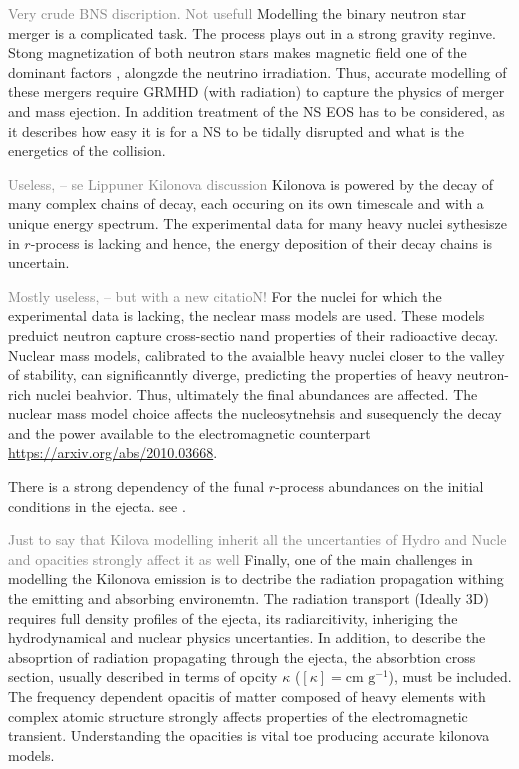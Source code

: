 \documentclass[11pt,a4paper,headinclude=true,DIV=14,BCOR=8mm,chapterprefix,listof=totoc,twoside,openright,abstracton]{scrbook}
\newcommand{\gray}[1]{\textcolor{gray}{#1}}
\begin{document}
\gray{Very crude BNS discription. Not usefull} 
Modelling the binary neutron star merger is a complicated task. The process plays out in a strong gravity reginve. Stong magnetization of both neutron stars makes magnetic field one of the dominant factors \cite{(Price & Rosswog 2006).}, alongzde the neutrino irradiation. Thus, accurate modelling of these mergers require GRMHD (with radiation) to capture the physics of merger and mass ejection. In addition treatment of the NS EOS has to be considered, as it describes how easy it is for a NS to be tidally disrupted and what is the energetics of the collision. \cite{(e.g. Bauswein et al. 2013; Hotokezaka et al. 2013a)}

\gray{Useless, -- se Lippuner Kilonova discussion}
Kilonova is powered by the decay of many complex chains of decay, each occuring on its own timescale and with a unique energy spectrum. The experimental data for many heavy nuclei sythesisze in $r$-process is lacking and hence, the energy deposition of their decay chains is uncertain. 

\gray{Mostly useless, -- but with a new citatioN!}
For the nuclei for which the experimental data is lacking, the neclear mass models are used. These models preduict neutron capture cross-sectio nand properties of their radioactive decay. 
Nuclear mass models, calibrated to the avaialble heavy nuclei closer to the valley of stability, can significanntly diverge, predicting the properties of heavy neutron-rich nuclei beahvior. Thus, ultimately the final abundances are affected. \cite{(Eichler et al. 2015; Mendoza-Temis et al. 2015).}
The nuclear mass model choice affects the nucleosytnehsis and susequencly the decay and the power available to the electromagnetic counterpart \url{https://arxiv.org/abs/2010.03668}. 

There is a strong dependency of the funal $r$-process abundances on the initial conditions in the ejecta. see \cite{(Lippuner & Roberts 2015}.

\gray{Just to say that Kilova modelling inherit all the uncertanties of Hydro and Nucle and opacities strongly affect it as well}
Finally, one of the main challenges in modelling the Kilonova emission is to dectribe the radiation propagation withing the emitting and absorbing environemtn. The radiation transport (Ideally 3D) requires full density profiles of the ejecta, its radiarcitivity, inheriging the hydrodynamical and nuclear physics uncertanties. In addition, to describe the absoprtion of radiation propagating through the ejecta, the absorbtion cross section, usually described in terms of opcity $\kappa$ ($[\kappa] = \text{cm g}^{-1}$), must be included. The frequency dependent opacitis of matter composed of heavy elements with complex atomic structure strongly affects properties of the electromagnetic transient. Understanding the opacities is vital toe producing accurate kilonova models. 
\end{document}
